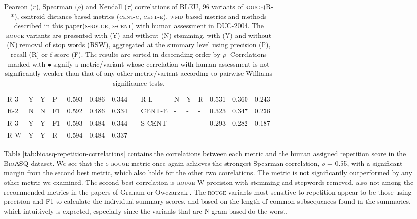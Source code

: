 \documentclass[11pt,a4paper]{article}
\newcommand{\rouge}{\textsc{rouge}\xspace}
\newcommand{\centc}{\textsc{cent-c}\xspace}
\newcommand{\cente}{\textsc{cent-e}\xspace}
\newcommand{\wmd}{\textsc{wmd}\xspace}
\newcommand{\bioasq}{\textsc{BioASQ}\xspace}
\newcommand{\duc}{\textsc{DUC-2004}\xspace}
\newcommand{\srouge}{\textsc{s-rouge}\xspace}
\newcommand{\scent}{\textsc{s-cent}\xspace}
\begin{document}
\begin{table}[]
{\begin{tabular}{lllllllllllllll}
\textsc{R-3} & Y & Y & P & 0.593 & 0.486 & 0.344 &  & \textsc{R-L} & N & Y & R & 0.531 & 0.360 & 0.243 \\
\textsc{R-2} & N & N & F1 & 0.592 & 0.486 & 0.334 &  & \textsc{CENT-E} & - & - & - & 0.323 & 0.347 & 0.236 \\
\textsc{R-3} & Y & Y & F1 & 0.593 & 0.484 & 0.344 &  & \textsc{S-CENT} & - & - & - & 0.293 & 0.282 & 0.187 \\
\textsc{R-W} & Y & Y & R & 0.594 & 0.484 & 0.337 &  &  &  &  &  &  &  &  \\ \hline
\end{tabular}
}
\caption{Pearson ($r$), Spearman ($\rho$) and Kendall ($\tau$) correlations of BLEU, 96 variants 
of \rouge (R-*), centroid distance based metrics (\centc, \cente), \wmd based metrics and 
methods described in this paper(\srouge, \scent) with human assessment in \duc. The \rouge 
variants are presented with (Y) and without (N) stemming, with (Y) and without (N) removal of 
stop words (RSW), aggregated at the summary level using precision (P), recall (R) or f-score (F).
The results are sorted in descending order by $\rho$. Correlations marked with $\bullet$ signify 
a metric/variant whose correlation with human assessment is not significantly weaker than that 
of any other metric/variant according to pairwise Williams significance tests.}
\label{tab:duc_correlations}
\end{table}

Table \ref{tab:bioasq-repetition-correlations} contains the correlations between each metric 
and the human assigned repetition score in the \bioasq dataset. We see that the \srouge metric 
once again achieves the strongest Spearman correlation, $\rho$ = 0.55, with a significant 
margin from the second best metric, which also holds for the other two correlations. The metric 
is not significantly outperformed by any other metric we examined. The second best correlation 
is \rouge-W precision with stemming and stopwords removed, also not among the recommended 
metrics in the papers of Graham  or Owczarzak . 
The \rouge variants most sensitive to repetition appear to be those using precision and F1 to 
calculate the individual summary scores, and based on the length of common subsequences 
found in the summaries, which intuitively is expected, especially since the variants that 
are N-gram based do the worst.
\end{document}
